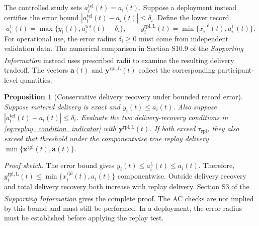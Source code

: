 \documentclass[twoside,twocolumn,9pt]{article}
\newtheorem{proposition}{Proposition}[section]
\newcommand{\suppref}{\textit{Supporting Information}\textsuperscript{\dag}}
\begin{document}
{The controlled study sets $a_i^{\mathrm{tel}}(t)=a_i(t)$. Suppose a deployment instead
certifies the error bound
$|a_i^{\mathrm{tel}}(t)-a_i(t)|\le\delta_i$. Define the lower record
\begin{equation}
a_i^{\mathrm{L}}(t)=\max\{y_i(t),a_i^{\mathrm{tel}}(t)-\delta_i\},
\qquad
y_i^{\mathrm{rpl,L}}(t)=\min\{x_i^{\mathrm{rpl}}(t),a_i^{\mathrm{L}}(t)\}.
\label{eq:robust_replay_lower_bound}
\end{equation}
For operational use, the error radius $\delta_i\ge0$ must come from independent
validation data. The numerical comparison in Section S10.9 of the \suppref{}
instead uses prescribed radii to examine the resulting delivery tradeoff.
The vectors $\mathbf a(t)$ and $\mathbf y^{\mathrm{rpl,L}}(t)$ collect the
corresponding participant-level quantities.

\begin{proposition}[Conservative delivery recovery under bounded record error]
\label{prop:robust_replay_recovery}
Suppose metered delivery is exact and $y_i(t)\le a_i(t)$. Also suppose
$|a_i^{\mathrm{tel}}(t)-a_i(t)|\le\delta_i$. Evaluate the two
delivery-recovery conditions in \eqref{eq:replay_condition_indicator} with
$\mathbf y^{\mathrm{rpl,L}}(t)$. If both
exceed $\tau_{\mathrm{rpl}}$, they also exceed that threshold under the
componentwise true replay delivery
$\min\{\mathbf x^{\mathrm{rpl}}(t),\mathbf a(t)\}$.
\end{proposition}
\noindent\textit{Proof sketch.}
The error bound gives $y_i(t)\le a_i^{\mathrm{L}}(t)\le a_i(t)$. Therefore,
$y_i^{\mathrm{rpl,L}}(t)\le\min\{x_i^{\mathrm{rpl}}(t),a_i(t)\}$ componentwise. Outside
delivery recovery and total delivery recovery both increase with replay
delivery. Section S3 of the \suppref{} gives the complete proof. The AC checks
are not implied by this bound and must still be performed. In a deployment, the
error radius must be established before applying the replay test.

}
\end{document}
